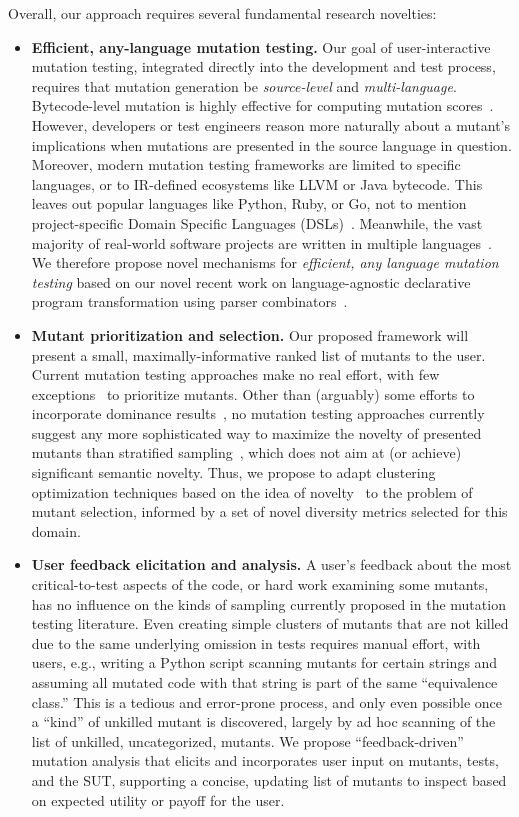 Overall, our approach requires several fundamental research novelties:
\begin{itemize}
\item \textbf{Efficient, any-language mutation testing.}
Our goal of user-interactive mutation testing, integrated directly into
the development and test process, requires that mutation generation be
\emph{source-level} and \emph{multi-language}.
Bytecode-level mutation is highly effective for computing
mutation scores~\cite{pittest,HaririLLVM}.  However, developers or test
engineers reason more naturally about a mutant's implications when mutations
are presented in the source language in question.  Moreover, modern mutation
testing frameworks are limited to specific languages, or to IR-defined
ecosystems like LLVM or Java bytecode.  This leaves out popular languages like Python, Ruby, or Go, not
to mention project-specific Domain Specific Languages (DSLs)~\cite{Fow10}.
Meanwhile, the vast majority of
real-world software projects are written in multiple languages~\cite{Ray2014}.
We therefore propose novel mechanisms for \emph{efficient, any language mutation
  testing} based on our novel recent work on language-agnostic declarative
program transformation using parser combinators~\cite{rvt-ppc}.
\item \textbf{Mutant prioritization and selection.}  Our
  proposed framework will present a small, maximally-informative ranked list of
  mutants to the user.
Current mutation testing approaches make
no real effort, with few exceptions~\cite{MutGoogle,FaRM} to prioritize mutants.
Other than (arguably) some efforts to
incorporate dominance results~\cite{MutQuality}, no mutation testing approaches
currently suggest any more sophisticated way to maximize the novelty of
presented mutants than stratified sampling~\cite{gopinath2017mutation}, which
does not aim at (or achieve) significant semantic novelty.  Thus,
we propose to adapt clustering optimization techniques based on the idea of
novelty~\cite{Gonzalez85} to the problem of mutant selection, informed by a set
of novel diversity metrics selected for this domain.
\item \textbf{User feedback elicitation and analysis.}
A
user's feedback about the most critical-to-test aspects of the code, or hard
work examining some mutants, has no influence on the kinds of sampling currently
proposed in the mutation testing literature.
Even creating simple clusters of
mutants that are not killed due to the same underlying omission in tests
requires manual effort, with users, e.g., writing a Python script scanning
mutants for certain strings and assuming all mutated code with that string is
part of the same ``equivalence class.''  This is a tedious and error-prone
process, and only even possible once a ``kind'' of unkilled mutant is
discovered, largely by ad hoc scanning of the list of unkilled, uncategorized,
mutants.
We propose ``feedback-driven'' mutation analysis that elicits and incorporates
user input on mutants, tests, and the SUT, supporting a concise, updating list
of mutants to inspect based on expected utility or payoff for the user.
\end{itemize}

